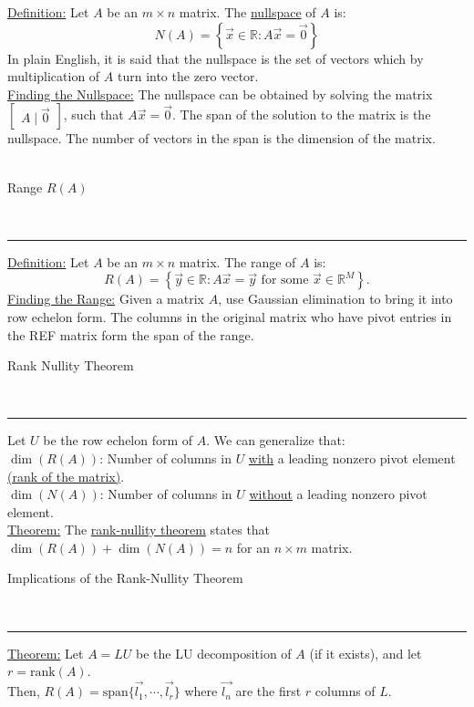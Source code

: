 \documentclass{article}
\newcommand{\header}[1]{\begin{large}\noindent #1\end{large}\\\rule{\textwidth}{0.5pt}}
\newcommand{\gap}{\medskip\\}
\begin{document}
\underline{Definition:} Let $A$ be an $m\times n$ matrix. The \underline{nullspace} of $A$ is:
\[
    N(A) = \left\{\vec{x} \in \mathbb{R} : A\vec{x} = \vec{0}\right\} 
\]
In plain English, it is said that the nullspace is the set of vectors which by multiplication
of $A$ turn into the zero vector.
\gap
\underline{Finding the Nullspace:} The nullspace can be obtained by solving the matrix
$\begin{bmatrix}
    A \mid \vec{0}
\end{bmatrix}$, such that $A\vec{x} = \vec{0}$. The span of the solution to the matrix
is the nullspace. The number of vectors in the span is the dimension of the matrix.
\\
\pagebreak
\\
\header{Range $R(A)$}

\underline{Definition:} Let $A$ be an $m\times n$ matrix. The range of $A$ is:
\[
    R(A) = \left\{\vec{y} \in \mathbb{R} : A\vec{x} = \vec{y} \textrm{ for some } \vec{x} \in \mathbb{R}^M \right\}.
\]
\underline{Finding the Range:} Given a matrix $A$, use Gaussian elimination to bring
it into row echelon form. The columns in the original matrix who have pivot entries
in the REF matrix form the span of the range.
\gap
\header{Rank Nullity Theorem}
Let $U$ be the row echelon form of $A$. We can generalize that:
\gap
$\dim(R(A))$: Number of columns in $U$ \underline{with} a leading nonzero pivot element \underline{(rank of the matrix)}.
\gap
$\dim(N(A))$: Number of columns in $U$ \underline{without} a leading nonzero pivot element.
\gap
\underline{Theorem:} The \underline{rank-nullity theorem} states that $\dim(R(A)) + \dim(N(A)) = n$
for an $n \times m$ matrix. 
\gap
\header{Implications of the Rank-Nullity Theorem}
\underline{Theorem:} Let $A=LU$ be the LU decomposition of $A$ (if it exists),
and let $r = \textrm{rank}(A)$.
\smallskip\\
Then, $R(A) = \textrm{span}\{\vec{l_1}, \cdots, \vec{l_r} \}$ where $\vec{l_n}$ are
the first $r$ columns of $L$.
\end{document}
